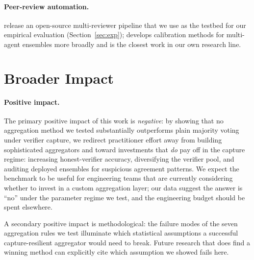 \documentclass[11pt]{article}
\begin{document}
\paragraph{Peer-review automation.}
\citet{liu2026paperreviewtoolkit} release an open-source multi-reviewer
pipeline that we use as the testbed for our empirical evaluation
(Section~\ref{sec:exp}); \citet{liu2026calibration} develops calibration
methods for multi-agent ensembles more broadly and is the closest work
in our own research line.

\section{Broader Impact}
\label{sec:broader}

\paragraph{Positive impact.}
The primary positive impact of this work is \emph{negative}: by
showing that no aggregation method we tested substantially outperforms
plain majority voting under verifier capture, we redirect practitioner
effort away from building sophisticated aggregators and toward
investments that \emph{do} pay off in the capture regime: increasing
honest-verifier accuracy, diversifying the verifier pool, and
auditing deployed ensembles for suspicious agreement patterns. We
expect the benchmark to be useful for engineering teams that are
currently considering whether to invest in a custom aggregation
layer; our data suggest the answer is ``no'' under the parameter
regime we test, and the engineering budget should be spent elsewhere.

A secondary positive impact is methodological: the failure modes of
the seven aggregation rules we test illuminate which statistical
assumptions a successful capture-resilient aggregator would need
to break. Future research that does find a winning method can
explicitly cite which assumption we showed fails here.
\end{document}
